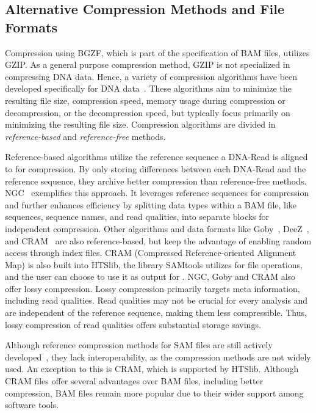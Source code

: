 \subsection{Alternative Compression Methods and File Formats}
Compression using BGZF, which is part of the specification of BAM files, utilizes GZIP. As a general purpose compression method, GZIP is not specialized in compressing DNA data. Hence, a variety of compression algorithms have been developed specifically for DNA data~\cite{hosseini_survey_2016}. These algorithms aim to minimize the resulting file size, compression speed, memory usage during compression or decompression, or the decompression speed, but typically focus primarily on minimizing the resulting file size. Compression algorithms are divided in \textit{reference-based} and \textit{reference-free} methods.

Reference-based algorithms utilize the reference sequence a DNA-Read is aligned to for compression. By only storing differences between each DNA-Read and the reference sequence, they archive better compression than reference-free methods. NGC~\cite{popitsch_ngc_2013} exemplifies this approach. It leverages reference sequences for compression and further enhances efficiency by splitting data types within a BAM file, like sequences, sequence names, and read qualities, into separate blocks for independent compression. Other algorithms and data formats like Goby~\cite{campagne_compression_2013}, DeeZ~\cite{hach_deez_2014}, and CRAM~\cite{fritz_efficient_2011} are also reference-based, but keep the advantage of enabling random access through index files. CRAM (Compressed Reference-oriented Alignment Map) is also built into HTSlib, the library SAMtools utilizes for file operations, and the user can choose to use it as output for \sort. NGC, Goby and CRAM also offer lossy compression. Lossy compression primarily targets meta information, including read qualities. Read qualities may not be crucial for every analysis and are independent of the reference sequence, making them less compressible. Thus, lossy compression of read qualities offers substantial storage savings.

Although reference compression methods for SAM files are still actively developed~\cite{banerjee_abridge_2022}, they lack interoperability, as the compression methods are not widely used. An exception to this is CRAM, which is supported by HTSlib. Although CRAM files offer several advantages over BAM files, including better compression, BAM files remain more popular due to their wider support among software tools.

